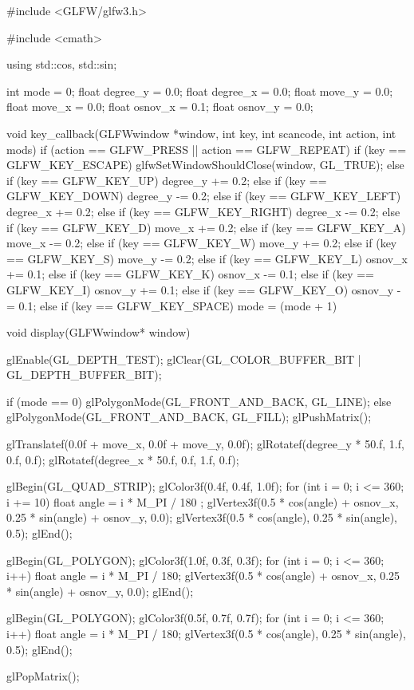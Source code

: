 #include <GLFW/glfw3.h>

#include <cmath>

using std::cos, std::sin;

int mode = 0;
float degree_y = 0.0;   
float degree_x = 0.0;
float move_y = 0.0;
float move_x = 0.0;
float osnov_x = 0.1;
float osnov_y = 0.0;

void key_callback(GLFWwindow *window, int key, int scancode, int action, int mods)
{
    if (action == GLFW_PRESS || action == GLFW_REPEAT)
    {
        if (key == GLFW_KEY_ESCAPE)
        {
            glfwSetWindowShouldClose(window, GL_TRUE);
        }
        else if (key == GLFW_KEY_UP)
        {
            degree_y += 0.2;
        }
        else if (key == GLFW_KEY_DOWN)
        {
            degree_y -= 0.2;
        }
        else if (key == GLFW_KEY_LEFT)
        {
            degree_x += 0.2;
        }
        else if (key == GLFW_KEY_RIGHT)
        {
            degree_x -= 0.2;
        }
        else if (key == GLFW_KEY_D)
        {
            move_x += 0.2;
        }
        else if (key == GLFW_KEY_A)
        {
            move_x -= 0.2;
        }
        else if (key == GLFW_KEY_W)
        {
            move_y += 0.2;
        }
        else if (key == GLFW_KEY_S)
        {
            move_y -= 0.2;
        }
        else if (key == GLFW_KEY_L)
        {
            osnov_x += 0.1;
        }
        else if (key == GLFW_KEY_K)
        {
            osnov_x -= 0.1;
        }
        else if (key == GLFW_KEY_I)
        {
            osnov_y += 0.1;
        }
        else if (key == GLFW_KEY_O)
        {
            osnov_y -= 0.1;
        }
        else if (key == GLFW_KEY_SPACE) {
            mode = (mode + 1) %
        }
    }
}


void display(GLFWwindow* window)
{
    glEnable(GL_DEPTH_TEST);
    glClear(GL_COLOR_BUFFER_BIT | GL_DEPTH_BUFFER_BIT);

    if (mode == 0) {
        glPolygonMode(GL_FRONT_AND_BACK, GL_LINE);
    } else {
        glPolygonMode(GL_FRONT_AND_BACK, GL_FILL);
    }
    glPushMatrix();


    glTranslatef(0.0f + move_x, 0.0f + move_y, 0.0f);
    glRotatef(degree_y * 50.f, 1.f, 0.f, 0.f);
    glRotatef(degree_x * 50.f, 0.f, 1.f, 0.f);

    glBegin(GL_QUAD_STRIP);
    glColor3f(0.4f, 0.4f, 1.0f);
    for (int i = 0; i <= 360; i += 10)
    {
        float angle = i * M_PI / 180 ;
        glVertex3f(0.5 * cos(angle) + osnov_x, 0.25 * sin(angle) + osnov_y, 0.0);
        glVertex3f(0.5 * cos(angle), 0.25 * sin(angle), 0.5);
    }
    glEnd();


    glBegin(GL_POLYGON);
    glColor3f(1.0f, 0.3f, 0.3f);
    for (int i = 0; i <= 360; i++)
    {
        float angle = i * M_PI / 180;
        glVertex3f(0.5 * cos(angle) + osnov_x, 0.25 * sin(angle) + osnov_y, 0.0);
    }
    glEnd();


    glBegin(GL_POLYGON);
    glColor3f(0.5f, 0.7f, 0.7f);
    for (int i = 0; i <= 360; i++)
    {
        float angle = i * M_PI / 180;
        glVertex3f(0.5 * cos(angle), 0.25 * sin(angle), 0.5);
    }
    glEnd();

    glPopMatrix();
}

